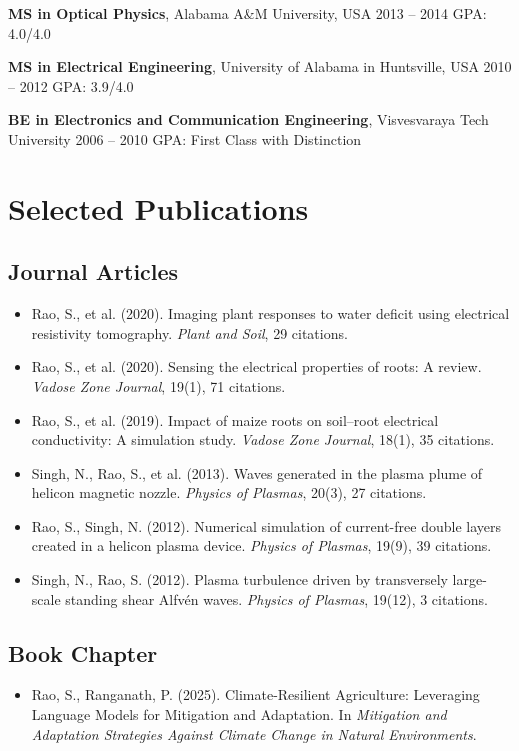 \documentclass[11pt,a4paper]{article}
\begin{document}
\textbf{MS in Optical Physics}, Alabama A\&M University, USA \hfill 2013 -- 2014  
GPA: 4.0/4.0  

\textbf{MS in Electrical Engineering}, University of Alabama in Huntsville, USA \hfill 2010 -- 2012  
GPA: 3.9/4.0  

\textbf{BE in Electronics and Communication Engineering}, Visvesvaraya Tech University \hfill 2006 -- 2010  
GPA: First Class with Distinction  

\section*{Selected Publications}

\subsection*{Journal Articles}
\begin{itemize}[leftmargin=*]
    \item Rao, S., et al. (2020). Imaging plant responses to water deficit using electrical resistivity tomography. \textit{Plant and Soil}, 29 citations.
    \item Rao, S., et al. (2020). Sensing the electrical properties of roots: A review. \textit{Vadose Zone Journal}, 19(1), 71 citations.
    \item Rao, S., et al. (2019). Impact of maize roots on soil–root electrical conductivity: A simulation study. \textit{Vadose Zone Journal}, 18(1), 35 citations.
    \item Singh, N., Rao, S., et al. (2013). Waves generated in the plasma plume of helicon magnetic nozzle. \textit{Physics of Plasmas}, 20(3), 27 citations.
    \item Rao, S., Singh, N. (2012). Numerical simulation of current-free double layers created in a helicon plasma device. \textit{Physics of Plasmas}, 19(9), 39 citations.
    \item Singh, N., Rao, S. (2012). Plasma turbulence driven by transversely large-scale standing shear Alfvén waves. \textit{Physics of Plasmas}, 19(12), 3 citations.
\end{itemize}

\subsection*{Book Chapter}
\begin{itemize}[leftmargin=*]
    \item Rao, S., Ranganath, P. (2025). Climate-Resilient Agriculture: Leveraging Language Models for Mitigation and Adaptation. In \textit{Mitigation and Adaptation Strategies Against Climate Change in Natural Environments}.
\end{itemize}
\end{document}
